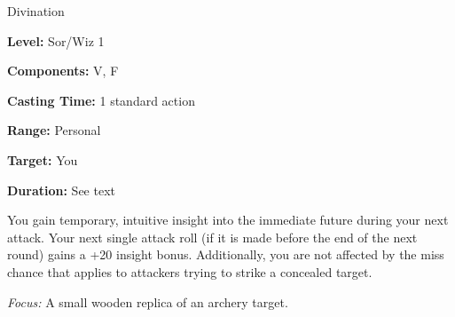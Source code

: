 
Divination

\textbf{Level:} Sor/Wiz 1

\textbf{Components:} V, F

\textbf{Casting Time:} 1 standard action

\textbf{Range:} Personal

\textbf{Target:} You

\textbf{Duration:} See text

You gain temporary, intuitive insight into the immediate future during your next 
attack. Your next single attack roll (if it is made before the end of the next 
round) gains a +20 insight bonus. Additionally, you are not affected by the miss 
chance that applies to attackers trying to strike a concealed target.

\textit{Focus:} A small wooden replica of an archery target.

